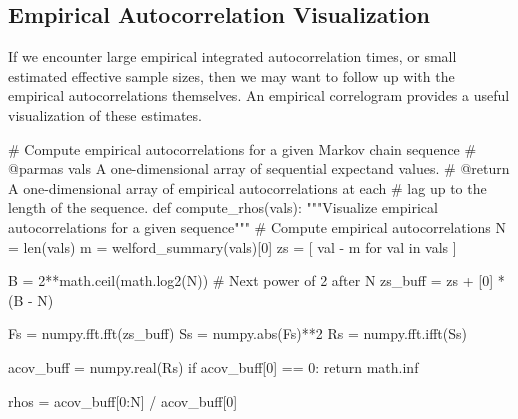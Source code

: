 \documentclass[
  letterpaper,
  DIV=11,
  numbers=noendperiod]{scrartcl}
\newenvironment{Shaded}{\begin{snugshade}}{\end{snugshade}}
\newcommand{\BuiltInTok}[1]{\textcolor[rgb]{0.00,0.23,0.31}{#1}}
\newcommand{\CommentTok}[1]{\textcolor[rgb]{0.37,0.37,0.37}{#1}}
\newcommand{\ControlFlowTok}[1]{\textcolor[rgb]{0.00,0.23,0.31}{#1}}
\newcommand{\DecValTok}[1]{\textcolor[rgb]{0.68,0.00,0.00}{#1}}
\newcommand{\KeywordTok}[1]{\textcolor[rgb]{0.00,0.23,0.31}{#1}}
\newcommand{\NormalTok}[1]{\textcolor[rgb]{0.00,0.23,0.31}{#1}}
\newcommand{\OperatorTok}[1]{\textcolor[rgb]{0.37,0.37,0.37}{#1}}
\begin{document}
\subsection{Empirical Autocorrelation
Visualization}\label{empirical-autocorrelation-visualization}

If we encounter large empirical integrated autocorrelation times, or
small estimated effective sample sizes, then we may want to follow up
with the empirical autocorrelations themselves. An empirical correlogram
provides a useful visualization of these estimates.

\begin{Shaded}
\begin{Highlighting}[]
\CommentTok{\# Compute empirical autocorrelations for a given Markov chain sequence}
\CommentTok{\# @parmas vals A one{-}dimensional array of sequential expectand values.}
\CommentTok{\# @return A one{-}dimensional array of empirical autocorrelations at each}
\CommentTok{\#         lag up to the length of the sequence.}
\KeywordTok{def}\NormalTok{ compute\_rhos(vals):}
  \CommentTok{"""Visualize empirical autocorrelations for a given sequence"""}
  \CommentTok{\# Compute empirical autocorrelations}
\NormalTok{  N }\OperatorTok{=} \BuiltInTok{len}\NormalTok{(vals)}
\NormalTok{  m }\OperatorTok{=}\NormalTok{ welford\_summary(vals)[}\DecValTok{0}\NormalTok{]}
\NormalTok{  zs }\OperatorTok{=}\NormalTok{ [ val }\OperatorTok{{-}}\NormalTok{ m }\ControlFlowTok{for}\NormalTok{ val }\KeywordTok{in}\NormalTok{ vals ]}
  
\NormalTok{  B }\OperatorTok{=} \DecValTok{2}\OperatorTok{**}\NormalTok{math.ceil(math.log2(N)) }\CommentTok{\# Next power of 2 after N}
\NormalTok{  zs\_buff }\OperatorTok{=}\NormalTok{ zs }\OperatorTok{+}\NormalTok{ [}\DecValTok{0}\NormalTok{] }\OperatorTok{*}\NormalTok{ (B }\OperatorTok{{-}}\NormalTok{ N)}
  
\NormalTok{  Fs }\OperatorTok{=}\NormalTok{ numpy.fft.fft(zs\_buff)}
\NormalTok{  Ss }\OperatorTok{=}\NormalTok{ numpy.}\BuiltInTok{abs}\NormalTok{(Fs)}\OperatorTok{**}\DecValTok{2}
\NormalTok{  Rs }\OperatorTok{=}\NormalTok{ numpy.fft.ifft(Ss)}
  
\NormalTok{  acov\_buff }\OperatorTok{=}\NormalTok{ numpy.real(Rs)}
  \ControlFlowTok{if}\NormalTok{ acov\_buff[}\DecValTok{0}\NormalTok{] }\OperatorTok{==} \DecValTok{0}\NormalTok{:}
    \ControlFlowTok{return}\NormalTok{ math.inf}

\NormalTok{  rhos }\OperatorTok{=}\NormalTok{ acov\_buff[}\DecValTok{0}\NormalTok{:N] }\OperatorTok{/}\NormalTok{ acov\_buff[}\DecValTok{0}\NormalTok{]}
  

\end{Highlighting}
\end{Shaded}
\end{document}
